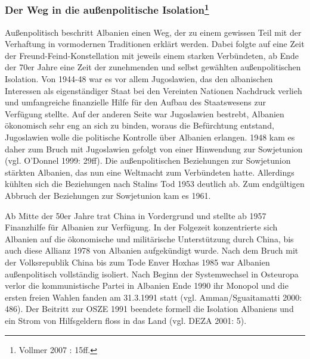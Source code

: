 \subsubsection[Der Weg in die außenpolitische Isolation]{Der Weg in die außenpolitische Isolation\footnote{Vollmer 2007 : 15ff.}}

Außenpolitisch beschritt Albanien einen Weg, der zu einem gewissen Teil mit der Verhaftung in vormodernen Traditionen erklärt werden. Dabei folgte auf eine Zeit der Freund-Feind-Konstellation mit jeweils einem starken Verbündeten, ab Ende der 70er Jahre eine Zeit der zunehmenden und selbst gewählten außenpolitischen Isolation. Von 1944-48 war es vor allem Jugoslawien, das den albanischen Interessen als eigenständiger Staat bei den Vereinten Nationen Nachdruck verlieh und umfangreiche finanzielle Hilfe für den Aufbau des Staatswesens zur Verfügung stellte. Auf der anderen Seite war Jugoslawien bestrebt, Albanien ökonomisch sehr eng an sich zu binden, woraus die Befürchtung entstand, Jugoslawien wolle die politische Kontrolle über Albanien erlangen. 1948 kam es daher zum Bruch mit Jugoslawien gefolgt von einer Hinwendung zur Sowjetunion (vgl. O’Donnel 1999: 29ff). Die außenpolitischen Beziehungen zur Sowjetunion stärkten Albanien, das nun eine Weltmacht zum Verbündeten hatte. Allerdings kühlten sich die Beziehungen nach Stalins Tod 1953 deutlich ab. Zum endgültigen Abbruch der Beziehungen zur Sowjetunion kam es 1961.\par
Ab Mitte der 50er Jahre trat China in Vordergrund und stellte ab 1957 Finanzhilfe für Albanien zur Verfügung. In der Folgezeit konzentrierte sich Albanien auf die ökonomische und militärische Unterstützung durch China, bis auch diese Allianz 1978 von Albanien aufgekündigt wurde. Nach dem Bruch mit der Volksrepublik China bis zum Tode Enver Hoxhas 1985 war Albanien außenpolitisch vollständig isoliert. Nach Beginn der Systemwechsel in Osteuropa verlor die kommunistische Partei in Albanien Ende 1990 ihr Monopol und die ersten freien Wahlen fanden am 31.3.1991 statt (vgl. Amman/Sguaitamatti 2000: 486). Der Beitritt zur OSZE 1991 beendete formell die Isolation Albaniens und ein Strom von Hilfsgeldern floss in das Land (vgl. DEZA 2001: 5).\par
